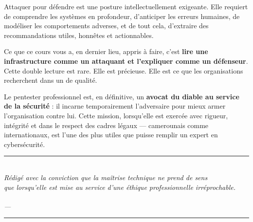 Attaquer pour défendre est une posture intellectuellement exigeante. Elle
requiert de comprendre les systèmes en profondeur, d'anticiper les erreurs
humaines, de modéliser les comportements adverses, et de tout cela,
d'extraire des recommandations utiles, honnêtes et actionnables.

Ce que ce cours vous a, en dernier lieu, appris à faire, c'est \textbf{lire
une infrastructure comme un attaquant et l'expliquer comme un défenseur}.
Cette double lecture est rare. Elle est précieuse. Elle est ce que les
organisations recherchent dans un  de qualité.

Le pentester professionnel est, en définitive, un \textbf{avocat du diable
au service de la sécurité} : il incarne temporairement l'adversaire pour
mieux armer l'organisation contre lui. Cette mission, lorsqu'elle est
exercée avec rigueur, intégrité et dans le respect des cadres légaux —
camerounais comme internationaux, est l'une des plus utiles que puisse
remplir un expert en cybersécurité.

\vspace{2ex}
\begin{center}
    {\color{CouleurAccent}\rule{0.6\linewidth}{1pt}}\\[0.8ex]
    {\small\itshape\color{CouleurPrimaire}
        Rédigé avec la conviction que la maîtrise technique ne prend de sens\\
        que lorsqu'elle est mise au service d'une éthique professionnelle irréprochable.}\\[0.5ex]
    {\small\bfseries\color{CouleurPrimaire}\auteurcours}\\[0.3ex]
    {\footnotesize\color{CouleurBordInfo}\itshape
        \institutionprimaire{} --- \anneescolaire}\\[0.8ex]
    {\color{CouleurAccent}\rule{0.6\linewidth}{1pt}}
\end{center}
